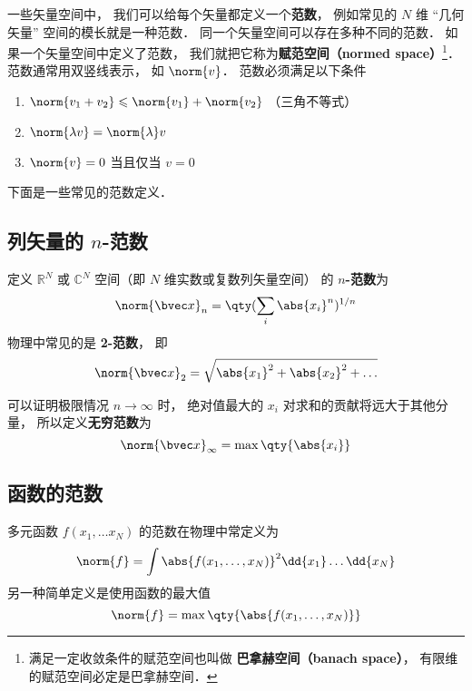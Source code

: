 

一些矢量空间中， 我们可以给每个矢量都定义一个\textbf{范数}， 例如常见的 $N$ 维 “几何矢量” 空间的模长就是一种范数． 同一个矢量空间可以存在多种不同的范数． 如果一个矢量空间中定义了范数， 我们就把它称为\textbf{赋范空间（normed space）}\footnote{满足一定收敛条件的赋范空间也叫做 \textbf{巴拿赫空间（banach space）}， 有限维的赋范空间必定是巴拿赫空间．%
}． 范数通常用双竖线表示， 如 $\norm{v}$． 范数必须满足以下条件

\begin{enumerate}
\item $\norm{v_1 + v_2} \leqslant \norm{v_1} + \norm{v_2}$ （三角不等式）
\item $\norm{\lambda v} = \norm{\lambda} v$
\item $\norm{v} = 0$ 当且仅当 $v = 0$
\end{enumerate}

下面是一些常见的范数定义．

\subsection{列矢量的 $n$-范数}
定义 $\mathbb R^N$ 或 $\mathbb C^N$ 空间（即 $N$ 维实数或复数列矢量空间） 的 \textbf{$n$-范数}为
\begin{equation}
\norm{\bvec x}_n = \qty(\sum_i \abs{x_i}^n)^{1/n}
\end{equation}
物理中常见的是 \textbf{2-范数}， 即
\begin{equation}
\norm{\bvec x}_2 = \sqrt{\abs{x_1}^2 + \abs{x_2}^2 + \dots}
\end{equation}

可以证明极限情况 $n \to \infty$ 时， 绝对值最大的 $x_i$ 对求和的贡献将远大于其他分量， 所以定义\textbf{无穷范数}为
\begin{equation}
\norm{\bvec x}_\infty = \max \qty{\abs{x_i}}
\end{equation}

\subsection{函数的范数}
多元函数 $f(x_1, \dots x_N)$ 的范数在物理中常定义为
\begin{equation}
\norm{f} = \int \abs{f(x_1, \dots, x_N)}^2 \dd{x_1}\dots \dd{x_N}
\end{equation}
另一种简单定义是使用函数的最大值
\begin{equation}
\norm{f} = \max\qty{\abs{f(x_1, \dots, x_N)}}
\end{equation}
